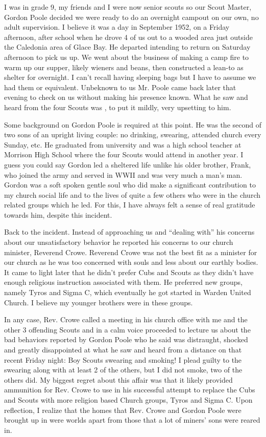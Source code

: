 I was in grade 9, my friends and I were now senior scouts so our Scout Master, Gordon Poole decided we were ready to do an overnight campout on our own, no adult supervision. I believe it was a day in September 1952, on a Friday afternoon, after school when he drove 4 of us out to a wooded area just outside the Caledonia area of Glace Bay. He departed intending to return on Saturday afternoon to pick us up. We went about the business of making a camp fire to warm up our supper, likely wieners and beans, then constructed a lean-to as shelter for overnight. I can't recall having sleeping bags but I have to assume we had them or equivalent. Unbeknown to us Mr. Poole came back later that evening to check on us without making his presence known. What he saw and heard from the four Scouts was , to put it mildly, very upsetting to him.

Some background on Gordon Poole is required at this point. He was the second of two sons of an upright living couple: no drinking, swearing, attended church every Sunday, etc. He graduated from university and was a high school teacher at Morrison High School where the four Scouts would attend in another year. I guess you could say Gordon led a sheltered life unlike his older brother, Frank, who joined the army and served in WWII and was very much a man's man. Gordon was a soft spoken gentle soul who did make a significant contribution to my church social life and to the lives of quite a few others who were in the church related groups which he led. For this, I have always felt a sense of real gratitude towards him, despite this incident.

Back to the incident. Instead of approaching us and “dealing with” his concerns about our unsatisfactory behavior he reported his concerns to our church minister, Reverend Crowe. Reverend Crowe was not the best fit as a minister for our church as he was too concerned with souls and less about our earthly bodies. It came to light later that he didn't prefer Cubs and Scouts as they didn't have enough religious instruction associated with them. He preferred new groups, namely Tyros and Sigma C, which eventually he got started in Warden United Church. I believe my younger brothers were in these groups.

In any case, Rev. Crowe called a meeting in his church office with me and the other 3 offending Scouts and in a calm voice proceeded to lecture us about the bad behaviors reported by Gordon Poole who he said was distraught, shocked and greatly disappointed at what he saw and heard from a distance on that recent Friday night: Boy Scouts swearing and smoking! I plead guilty to the swearing along with at least 2 of the others, but I did not smoke, two of the others did. My biggest regret about this affair was that it likely provided ammunition for Rev. Crowe to use in his successful attempt to replace the Cubs and Scouts with more religion based Church groups, Tyros and Sigma C. Upon reflection, I realize that the homes that Rev. Crowe and Gordon Poole were brought up in were worlds apart from those that a lot of miners' sons were reared in.

